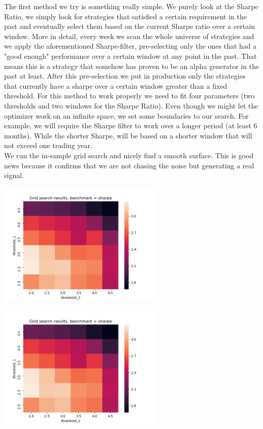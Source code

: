 The first method we try is something really simple. We purely look at the Sharpe Ratio, we simply look for strategies that satisfied a certain requirement in the past and eventually select them based on the current Sharpe ratio over a certain window. More in detail, every week we scan the whole universe of strategies and we apply the aforementioned Sharpe-filter, pre-selecting only the ones that had a "good enough" performance over a certain window at any point in the past. That means this is a strategy that somehow has proven to be an alpha generator in the past at least. After this pre-selection we put in production only the strategies that currently have a sharpe over a certain window greater than a fixed threshold. For this method to work properly we need to fit four parameters (two thresholds and two windows for the Sharpe Ratio). Even though we might let the optimizer work on an infinite space, we set some boundaries to our search. For example, we will require the Sharpe filter to work over a longer period (at least 6 months). While the shorter Sharpe, will be based on a shorter window that will not exceed one trading year.\\
We run the in-sample grid search and nicely find a smooth surface. This is good news because it confirms that we are not chasing the noise but generating a real signal. 

\begin{center}
	\centering
	\includegraphics[width=0.6\textwidth]{GridSearches/Sharpe_Basic/Figure_1.png}
	\label{Sharpe_Simple_1}
\end{center}

\begin{center}
	\centering
	\includegraphics[width=0.6\textwidth]{GridSearches/Sharpe_Basic/Figure_1.png}
	\label{Sharpe_Ranking_2}
\end{center}

